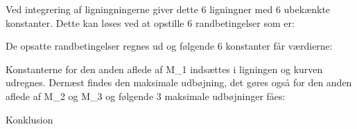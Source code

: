 Ved integrering af ligningningerne giver dette 6 ligningner med 6 ubekænkte konstanter. Dette kan løses ved at opstille 6 randbetingelser som er: 


De opsatte randbetingelser regnes ud og følgende 6 konstanter får værdierne: 


Konstanterne for den anden aflede af M_1 indsættes i ligningen og kurven udregnes. Dernæst findes den maksimale udbøjning, det gøres også for den anden aflede af M_2 og M_3 og følgende 3 maksimale udbøjninger fåes: 


Konklusion